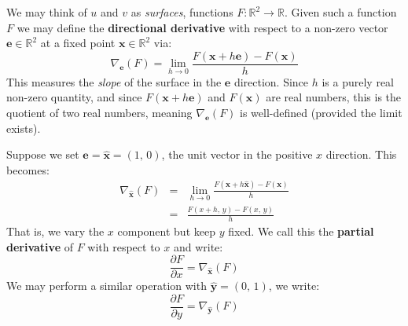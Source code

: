 \documentclass{article}
\theoremstyle{definition}
\begin{document}
            We may think of $u$ and $v$ as \textit{surfaces}, functions
            $F:\mathbb{R}^{2}\rightarrow\mathbb{R}$. Given such a function
            $F$ we may define the \textbf{directional derivative} with respect
            to a non-zero vector $\mathbf{e}\in\mathbb{R}^{2}$ at a fixed point
            $\mathbf{x}\in\mathbb{R}^{2}$ via:
            \begin{equation}
                \nabla_{\mathbf{e}}(F)
                =\lim_{h\rightarrow{0}}
                \frac{F(\mathbf{x}+h\mathbf{e})-F(\mathbf{x})}{h}
            \end{equation}
            This measures the \textit{slope} of the surface in the $\mathbf{e}$
            direction. Since $h$ is a purely real non-zero quantity, and since
            $F(\mathbf{x}+h\mathbf{e})$ and $F(\mathbf{x})$ are real numbers,
            this is the quotient of two real numbers, meaning
            $\nabla_{\mathbf{e}}(F)$ is well-defined
            (provided the limit exists).
            \par\hfill\par
            Suppose we set $\mathbf{e}=\hat{\mathbf{x}}=(1,\,0)$, the unit
            vector in the positive $x$ direction. This becomes:
            \begin{equation}
                \begin{array}{rcl}
                    \displaystyle
                    \nabla_{\hat{\mathbf{x}}}(F)
                    &=&
                    \displaystyle
                    \lim_{h\rightarrow{0}}
                    \frac{F(\mathbf{x}+h\hat{\mathbf{x}})-F(\mathbf{x})}{h}
                    \\[2em]
                    &=&
                    \displaystyle
                    \frac{F(x+h,\,y)-F(x,\,y)}{h}
                \end{array}
            \end{equation}
            That is, we vary the $x$ component but keep $y$ fixed. We call this
            the \textbf{partial derivative} of $F$ with respect to $x$ and
            write:
            \begin{equation}
                \frac{\partial{F}}{\partial{x}}
                =\nabla_{\hat{\mathbf{x}}}(F)
            \end{equation}
            We may perform a similar operation with $\hat{\mathbf{y}}=(0,\,1)$,
            we write:
            \begin{equation}
                \frac{\partial{F}}{\partial{y}}
                =\nabla_{\hat{\mathbf{y}}}(F)
            \end{equation}
\end{document}
